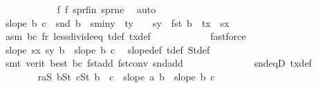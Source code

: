 \begin{isabellebody}
\ \ \ \ \ \ \ \ \ \ \isamarkupfalse%
\ f{}\ f{}\ s{}pr{\isacharunderscore}{\kern0pt}fin\ s{}pr{\isacharunderscore}{\kern0pt}ne\ \isamarkupfalse%
\ auto\isanewline
\ \ \ \ \ \ \ \ \isamarkupfalse%
\ {\isachardoublequoteopen}slope\ b\ c\ {\isacharless}{\kern0pt}\ {\isacharparenleft}{\kern0pt}snd\ b{}\ {\isacharminus}{\kern0pt}\ s{}{\isacharunderscore}{\kern0pt}miny\ {\isacharplus}{\kern0pt}\ ty{}\ {\isacharplus}{\kern0pt}\ {}\ {\isacharminus}{\kern0pt}\ s{}y{\isacharparenright}{\kern0pt}\ {\isacharslash}{\kern0pt}\ {\isacharparenleft}{\kern0pt}fst\ b{}\ {\isacharplus}{\kern0pt}\ tx\ {\isacharminus}{\kern0pt}\ s{}x{\isacharparenright}{\kern0pt}{\isachardoublequoteclose}\isanewline
\ \ \ \ \ \ \ \ \ \ \isamarkupfalse%
\ asm{\isacharparenleft}{\kern0pt}{}{\isacharparenright}{\kern0pt}\ b{}c{}{\isacharparenleft}{\kern0pt}{}{\isacharparenright}{\kern0pt}\ f{}r{}\ less{\isacharunderscore}{\kern0pt}divide{\isacharunderscore}{\kern0pt}eq\ t{\isacharunderscore}{\kern0pt}def\ tx{\isacharunderscore}{\kern0pt}def\isanewline
\ \ \ \ \ \ \ \ \ \ \isamarkupfalse%
\ fastforce\isanewline
\ \ \ \ \ \ \ \ \isamarkupfalse%
\ {\isachardoublequoteopen}slope\ {\isacharparenleft}{\kern0pt}s{}x{\isacharcomma}{\kern0pt}\ s{}y{\isacharparenright}{\kern0pt}\ b\ {\isachargreater}{\kern0pt}\ slope\ b\ c{\isachardoublequoteclose}\ \isamarkupfalse%
\ slope{\isacharunderscore}{\kern0pt}def\ t{\isacharunderscore}{\kern0pt}def\ S{}t{\isacharunderscore}{\kern0pt}def\isanewline
\ \ \ \ \ \ \ \ \ \ \isamarkupfalse%
\ {\isacharparenleft}{\kern0pt}smt\ {\isacharparenleft}{\kern0pt}verit{\isacharcomma}{\kern0pt}\ best{\isacharparenright}{\kern0pt}\ b{}c{}{\isacharparenleft}{\kern0pt}{}{\isacharparenright}{\kern0pt}\ fst{\isacharunderscore}{\kern0pt}add\ fst{\isacharunderscore}{\kern0pt}conv\ snd{\isacharunderscore}{\kern0pt}add\isanewline
\ \ \ \ \ \ \ \ \ \ \ \ \ \ snd{\isacharunderscore}{\kern0pt}eqD\ tx{\isacharunderscore}{\kern0pt}def{\isacharparenright}{\kern0pt}\isanewline
\ \ \ \ \ \ \isamarkupfalse%
\isanewline
\ \ \ \ \ \ \isamarkupfalse%
\ r{}{\isacharcolon}{\kern0pt}{\isachardoublequoteopen}{\isasymforall}a{\isasymin}S{}{\isachardot}{\kern0pt}\ {\isasymforall}b{\isasymin}S{}t{\isachardot}{\kern0pt}\ {\isasymforall}c{\isasymin}S{}t{\isachardot}{\kern0pt}\ b\ {\isacharless}{\kern0pt}\ c\ {\isasymlongrightarrow}\ slope\ a\ b\ {\isachargreater}{\kern0pt}\ slope\ b\ c{\isachardoublequoteclose}\isanewline

\end{isabellebody}
